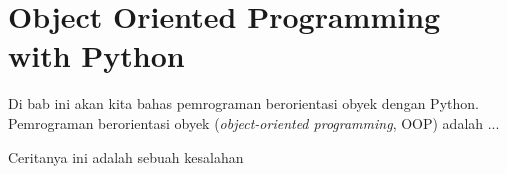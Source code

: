 
\chapter{Object Oriented Programming with Python}

Di bab ini akan kita bahas pemrograman berorientasi obyek dengan Python. Pemrograman berorientasi obyek (\emph{object-oriented programming}, OOP) adalah ...

Ceritanya ini adalah sebuah kesalahan


